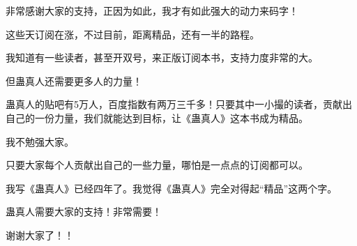 \begin{this_body}
非常感谢大家的支持，正因为如此，我才有如此强大的动力来码字！

这些天订阅在涨，不过目前，距离精品，还有一半的路程。

我知道有一些读者，甚至开双号，来正版订阅本书，支持力度非常的大。

但蛊真人还需要更多人的力量！

蛊真人的贴吧有5万人，百度指数有两万三千多！只要其中一小撮的读者，贡献出自己的一份力量，我们就能达到目标，让《蛊真人》这本书成为精品。

我不勉强大家。

只要大家每个人贡献出自己的一些力量，哪怕是一点点的订阅都可以。

我写《蛊真人》已经四年了。我觉得《蛊真人》完全对得起“精品”这两个字。

蛊真人需要大家的支持！非常需要！

谢谢大家了！！

\end{this_body}

